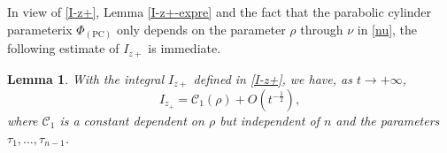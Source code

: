 \documentclass[11pt,a4paper]{article}
\newtheorem{lemma}[thm]{Lemma}
\numberwithin{equation}{section}
\begin{document}
In view of \eqref{I-z+}, Lemma \ref{I-z+-expre} and the fact that the parabolic cylinder parameterix $\Phi_{(\mathrm{PC})}$ only depends on the parameter $\rho$ through $\nu$ in \eqref{nu}, the following estimate of $I_{z+}$ is immediate.
\begin{lemma}\label{I-z+-asympt}
With the integral $I_{z+}$ defined in \eqref{I-z+}, we have, as $t\to+\infty$,
\begin{equation*}
I_{z_+}=\mathcal{C}_1(\rho)+O\left(t^{-\frac{1}{2}}\right),
\end{equation*}
where $\mathcal{C}_1$ is a constant dependent on $\rho$ but independent of $n$ and the parameters $\tau_1,\ldots,\tau_{n-1}$.
\end{lemma}
\end{document}
